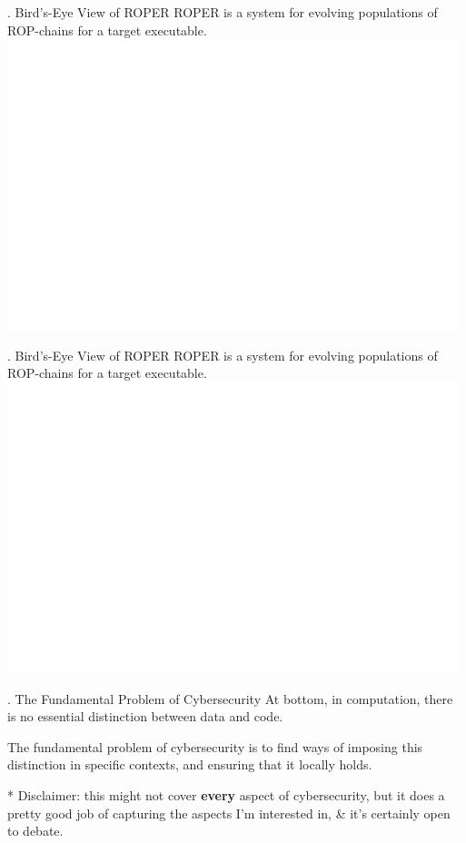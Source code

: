 \documentclass[9pt]{beamer}
\newcommand{\Gap} { \\ \pause \vspace{8pt} }
\begin{document}
\begin{frame}{\theframenumber. Bird's-Eye View of ROPER}
  ROPER is a system for evolving populations of ROP-chains for a target executable. 
      \includegraphics[width=\textwidth]{../images/architecture-transparent.png}
\end{frame}

\begin{frame}{\theframenumber. Bird's-Eye View of ROPER}
  ROPER is a system for evolving populations of ROP-chains for a target executable. 
      \includegraphics[width=\textwidth]{../images/architecture-transparent-gadget-extraction.png}
\end{frame}


\begin{frame}{\theframenumber. The Fundamental Problem of Cybersecurity}
  At bottom, in computation, there is no essential distinction between data and
  code.
  \Gap
  
  The fundamental problem of cybersecurity is to find ways of imposing this
  distinction in specific contexts, and ensuring that it locally holds.
  \Gap

      {\tiny
        * Disclaimer: this might not cover \textbf{every} aspect of cybersecurity, but it does a pretty good job of capturing the aspects I'm interested in, \& it's certainly open to debate.
      }
\end{frame}
\end{document}

